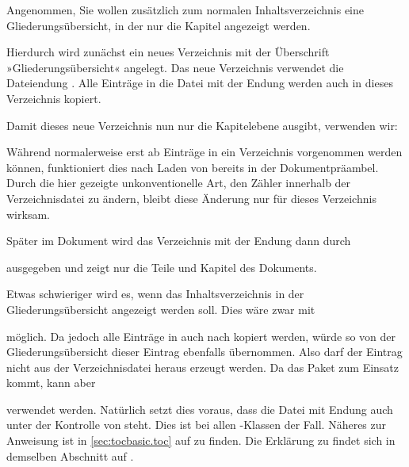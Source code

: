 \begin{Example}
  Angenommen, Sie wollen zusätzlich zum normalen Inhaltsverzeichnis eine
  Gliederungsübersicht, in der nur die Kapitel angezeigt werden.
\begin{lstcode}
  \usepackage{scrwfile}
\end{lstcode}
  Hierdurch wird zunächst ein neues Verzeichnis mit der Überschrift
  »Gliederungsübersicht« angelegt. Das neue Verzeichnis verwendet die
  Dateiendung . Alle Einträge in die Datei mit der Endung
   werden auch in dieses Verzeichnis kopiert.

  Damit dieses neue Verzeichnis nun nur die Kapitelebene ausgibt, verwenden
  wir: 
\begin{lstcode}
\end{lstcode}
  Während normalerweise erst ab
   Einträge in ein Verzeichnis vorgenommen
  werden können, funktioniert dies nach Laden von  bereits
  in der Dokumentpräambel. Durch die hier gezeigte unkonventionelle Art, den
  Zähler  innerhalb der Verzeichnisdatei zu
  ändern, bleibt diese Änderung nur für dieses Verzeichnis wirksam.

  Später im Dokument wird das Verzeichnis mit der Endung  dann
  durch
\begin{lstcode}[moretexcs={listofstoc}]
  \listofstoc
\end{lstcode}
  ausgegeben und zeigt nur die Teile und Kapitel des Dokuments.

  Etwas schwieriger wird es, wenn das Inhaltsverzeichnis in der
  Gliederungsübersicht angezeigt werden soll. Dies wäre zwar mit
\begin{lstcode}
\end{lstcode}
  möglich. Da jedoch alle Einträge in  auch nach  kopiert
  werden, würde so von der Gliederungsübersicht dieser Eintrag ebenfalls
  übernommen. Also darf der Eintrag nicht aus der Verzeichnisdatei heraus
  erzeugt werden. Da das Paket \hyperref[cha:tocbasic]{}%
   zum Einsatz kommt,
  kann aber%
\begin{lstcode}
\end{lstcode}
  verwendet werden. Natürlich setzt dies voraus, dass die
  Datei mit Endung  auch unter der Kontrolle von
  \hyperref[cha:tocbasic]{} steht. Dies ist bei allen
  \KOMAScript-Klassen der Fall. Näheres zur Anweisung
   ist in \autoref{sec:tocbasic.toc}
  auf  zu finden. Die Erklärung zu
   findet sich in demselben Abschnitt
  auf .%
\end{Example}%
